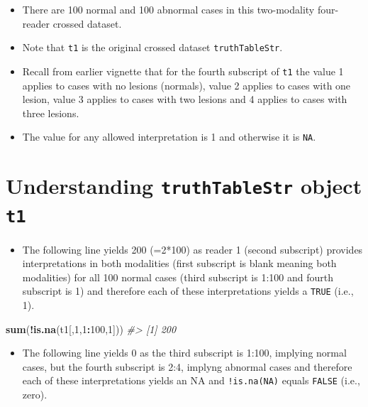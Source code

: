 \documentclass[]{book}
\newenvironment{Shaded}{\begin{snugshade}}{\end{snugshade}}
\newcommand{\CommentTok}[1]{\textcolor[rgb]{0.56,0.35,0.01}{\textit{#1}}}
\newcommand{\DecValTok}[1]{\textcolor[rgb]{0.00,0.00,0.81}{#1}}
\newcommand{\KeywordTok}[1]{\textcolor[rgb]{0.13,0.29,0.53}{\textbf{#1}}}
\newcommand{\NormalTok}[1]{#1}
\newcommand{\OperatorTok}[1]{\textcolor[rgb]{0.81,0.36,0.00}{\textbf{#1}}}
\providecommand{\tightlist}{%
  \setlength{\itemsep}{0pt}\setlength{\parskip}{0pt}}
\begin{document}
\begin{itemize}
\tightlist
\item
  There are 100 normal and 100 abnormal cases in this two-modality four-reader crossed dataset.
\item
  Note that \texttt{t1} is the original crossed dataset \texttt{truthTableStr}.
\item
  Recall from earlier vignette that for the fourth subscript of \texttt{t1} the value 1 applies to cases with no lesions (normals), value 2 applies to cases with one lesion, value 3 applies to cases with two lesions and 4 applies to cases with three lesions.
\item
  The value for any allowed interpretation is 1 and otherwise it is \texttt{NA}.
\end{itemize}

\hypertarget{understanding-truthtablestr-object-t1}{%
\section{\texorpdfstring{Understanding \texttt{truthTableStr} object \texttt{t1}}{Understanding truthTableStr object t1}}\label{understanding-truthtablestr-object-t1}}

\begin{itemize}
\tightlist
\item
  The following line yields 200 (=2*100) as reader 1 (second subscript) provides interpretations in both modalities (first subscript is blank meaning both modalities) for all 100 normal cases (third subscript is 1:100 and fourth subscript is 1) and therefore each of these interpretations yields a \texttt{TRUE} (i.e., 1).
\end{itemize}

\begin{Shaded}
\begin{Highlighting}[]
\KeywordTok{sum}\NormalTok{(}\OperatorTok{!}\KeywordTok{is.na}\NormalTok{(t1[,}\DecValTok{1}\NormalTok{,}\DecValTok{1}\OperatorTok{:}\DecValTok{100}\NormalTok{,}\DecValTok{1}\NormalTok{]))}
\CommentTok{#> [1] 200}
\end{Highlighting}
\end{Shaded}

\begin{itemize}
\tightlist
\item
  The following line yields 0 as the third subscript is 1:100, implying normal cases, but the fourth subscript is 2:4, implyng abnormal cases and therefore each of these interpretations yields an NA and \texttt{!is.na(NA)} equals \texttt{FALSE} (i.e., zero).
\end{itemize}
\end{document}
